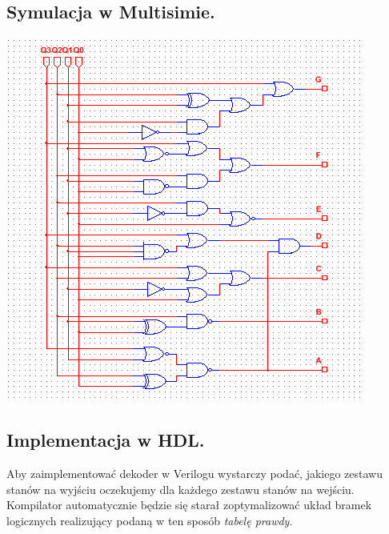 \documentclass[a4paper,oneside]{report}
\newcommand{\bcdtoseg}{\texttt{bcd\textunderscore to\textunderscore 7seg}}
\begin{document}
\subsection{Symulacja w Multisimie.}
\includegraphics[width=\textwidth]{multisim/bcdto7seg.png}
\subsection{Implementacja w HDL.}
Aby zaimplementować dekoder w Verilogu wystarczy podać, jakiego
zestawu stanów na wyjściu oczekujemy dla każdego zestawu stanów na
wejściu. Kompilator automatycznie będzie się starał zoptymalizować
układ bramek logicznych realizujący podaną w ten sposób
\emph{tabelę prawdy}.


\end{document}
